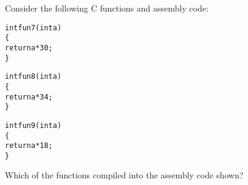 \begin{problem}{3}
\end{problem}
Consider the following C functions and assembly code:

\vspace{.5ex}

\begin{minipage}{3in}
\begin{ccode}
\begin{alltt}
int fun7(int a)
\verb:{:
    return a * 30;
\verb:}:
\end{alltt}
\begin{alltt}
int fun8(int a)
\verb:{:
    return a * 34;
\verb:}:
\end{alltt}
\begin{alltt}
int fun9(int a)
\verb:{:
    return a * 18;
\verb:}:
\end{alltt}
\end{ccode}
\end{minipage}
\begin{minipage}{3in}
\end{minipage}


\vspace{.5ex}

Which of the functions compiled into the assembly code shown?

